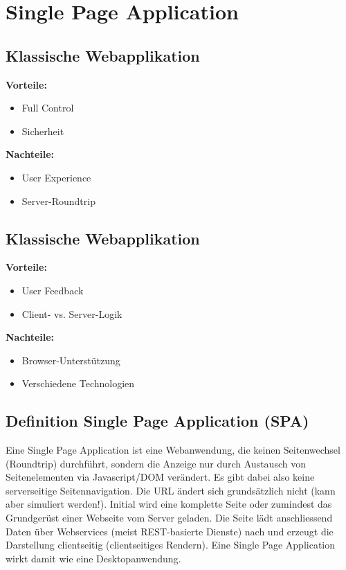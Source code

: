 \section{Single Page Application}
\subsection{Klassische Webapplikation}

\textbf{Vorteile:}\\

\begin{itemize}
	\item Full Control
	\item Sicherheit
\end{itemize}

\textbf{Nachteile:}\\

\begin{itemize}
	\item User Experience
	\item Server-Roundtrip
\end{itemize}

\subsection{Klassische Webapplikation}

\textbf{Vorteile:}\\

\begin{itemize}
	\item User Feedback
	\item Client- vs. Server-Logik
\end{itemize}

\textbf{Nachteile:}\\

\begin{itemize}
	\item Browser-Unterstützung
	\item Verschiedene Technologien
\end{itemize}

\subsection{Definition Single Page Application (SPA)}
Eine Single Page Application ist eine Webanwendung, die keinen Seitenwechsel (Roundtrip) durchführt, sondern die Anzeige nur durch Austausch von Seitenelementen via Javascript/DOM verändert. Es gibt dabei also keine serverseitige Seitennavigation. Die URL ändert sich grundsätzlich nicht (kann aber simuliert werden!).
Initial wird eine komplette Seite oder zumindest das Grundgerüst einer Webseite vom Server geladen. Die Seite lädt anschliessend Daten über Webservices (meist REST-basierte Dienste) nach und erzeugt die Darstellung clientseitig (clientseitiges Rendern).
Eine Single Page Application wirkt damit wie eine Desktopanwendung.
